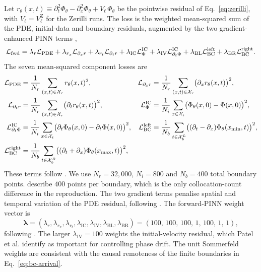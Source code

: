 Let $r_\theta(x,t) \equiv \partial_t^2\Phi_\theta -
\partial_x^2\Phi_\theta + V_\ell\,\Phi_\theta$ be the pointwise
residual of Eq.~\eqref{eq:zerilli}, with
$V_\ell=V_\ell^{\mathrm{Z}}$ for the Zerilli runs. The loss is the
weighted mean-squared sum of the PDE, initial-data and boundary
residuals, augmented by the two gradient-enhanced PINN terms
\citep{Yu2022gpinn},
\begin{equation}
  \mathcal{L}_{\mathrm{fwd}}
  = \lambda_{r}     \mathcal{L}_{\mathrm{PDE}}
  + \lambda_{r_x}   \mathcal{L}_{\partial_x r}
  + \lambda_{r_t}   \mathcal{L}_{\partial_t r}
  + \lambda_{\mathrm{IC}} \mathcal{L}_{\Phi}^{\mathrm{IC}}
  + \lambda_{\mathrm{IV}} \mathcal{L}_{\partial_t\Phi}^{\mathrm{IC}}
  + \lambda_{\mathrm{BL}} \mathcal{L}_{\mathrm{BC}}^{\mathrm{left}}
  + \lambda_{\mathrm{BR}} \mathcal{L}_{\mathrm{BC}}^{\mathrm{right}}.
  \label{eq:loss-fwd}
\end{equation}
The seven mean-squared component losses are
\begin{align}
  \mathcal{L}_{\mathrm{PDE}} &= \frac{1}{N_r}\sum_{(x,t)\in\mathcal{X}_r}
            r_\theta(x,t)^{2},
  & \mathcal{L}_{\partial_x r} &= \frac{1}{N_r}\sum_{(x,t)\in\mathcal{X}_r}
            \bigl(\partial_x r_\theta(x,t)\bigr)^{2},
  \nonumber\\
  \mathcal{L}_{\partial_t r} &= \frac{1}{N_r}\sum_{(x,t)\in\mathcal{X}_r}
            \bigl(\partial_t r_\theta(x,t)\bigr)^{2},
  & \mathcal{L}_{\Phi}^{\mathrm{IC}} &= \frac{1}{N_i}\sum_{x\in\mathcal{X}_i}
            \bigl(\Phi_\theta(x,0)-\Phi(x,0)\bigr)^{2},
  \nonumber\\
  \mathcal{L}_{\partial_t\Phi}^{\mathrm{IC}}
     &= \frac{1}{N_i}\sum_{x\in\mathcal{X}_i}
        \bigl(\partial_t\Phi_\theta(x,0)-\partial_t\Phi(x,0)\bigr)^{2},
  & \mathcal{L}_{\mathrm{BC}}^{\mathrm{left}}
     &= \frac{1}{N_b}\sum_{t\in\mathcal{X}_b^{L}}
        \bigl((\partial_t-\partial_x)\Phi_\theta(x_{\min},t)\bigr)^{2},
  \nonumber\\
  \mathcal{L}_{\mathrm{BC}}^{\mathrm{right}}
     &= \frac{1}{N_b}\sum_{t\in\mathcal{X}_b^{R}}
        \bigl((\partial_t+\partial_x)\Phi_\theta(x_{\max},t)\bigr)^{2},
  & &
  \label{eq:loss-components}
\end{align}
These terms follow \citet[Eqs.~(4)--(10)]{Patel2024pinn}. We use
$N_r=32{,}000$, $N_i=800$ and $N_b=400$ total boundary points.
\citet{Patel2024pinn} describe $400$ points per boundary, which is the
only collocation-count difference in the reproduction. The two
gradient terms penalise spatial and temporal variation of the PDE
residual, following \citet{Yu2022gpinn}. The
forward-PINN weight vector is
\begin{equation}
  \boldsymbol{\lambda}
  = (\lambda_{r},\lambda_{r_x},\lambda_{r_t},\lambda_{\mathrm{IC}},
     \lambda_{\mathrm{IV}},\lambda_{\mathrm{BL}},\lambda_{\mathrm{BR}})
  = (100,\,100,\,100,\,1,\,100,\,1,\,1),
  \label{eq:weights}
\end{equation}
following \citet{Patel2024pinn}. The larger
$\lambda_{\mathrm{IV}}=100$ weights the initial-velocity residual,
which Patel et al. identify as important for controlling phase drift.
The unit Sommerfeld weights are consistent with the causal remoteness
of the finite boundaries in Eq.~\eqref{eq:bc-arrival}.

